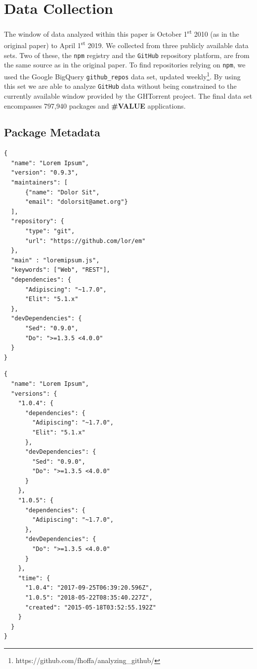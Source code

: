 \documentclass[10pt,conference]{IEEEtran}
\def\code#1{\texttt{#1}}
\begin{document}
\section{Data Collection}
The window of data analyzed within this paper is October 1\textsuperscript{st} 2010 (as in the original paper) to April 1\textsuperscript{st} 2019.
We collected from three publicly available data sets. Two of these, the \code{npm} registry and the \code{GitHub} repository platform, are from the same source as in the original paper.
To find repositories relying on \code{npm}, we used the Google BigQuery \code{github\_repos} data set, updated weekly\footnote{https://github.com/fhoffa/analyzing\_github/}.
By using this set we are able to analyze \code{GitHub} data without being constrained to the currently available window provided by the GHTorrent project\cite{Gousi13}.
The final data set encompasses 797,940 packages and \textbf{\#VALUE} applications.

\subsection{Package Metadata} \label{PackageMetadata}

\begin{lstlisting}[caption={A mock \code{npm} package.json. Some fields omitted for brevity.},captionpos=b,
  label=samplePkg, frame=single, firstline=1]
{
  "name": "Lorem Ipsum",
  "version": "0.9.3",
  "maintainers": [
      {"name": "Dolor Sit",
      "email": "dolorsit@amet.org"}
  ],
  "repository": {
      "type": "git",
      "url": "https://github.com/lor/em"
  },
  "main" : "loremipsum.js",
  "keywords": ["Web", "REST"],
  "dependencies": {
      "Adipiscing": "~1.7.0",
      "Elit": "5.1.x"
  },
  "devDependencies": {
      "Sed": "0.9.0",
      "Do": ">=1.3.5 <4.0.0" 
  }
}
\end{lstlisting}

\begin{lstlisting}[caption={A mock simplified \code{npm} metadata file.},captionpos=b,
  label=sampleSimpleMetadata, frame=single, firstline=1]
{
  "name": "Lorem Ipsum",
  "versions": {
    "1.0.4": {
      "dependencies": {
        "Adipiscing": "~1.7.0",
        "Elit": "5.1.x"
      },
      "devDependencies": {
        "Sed": "0.9.0",
        "Do": ">=1.3.5 <4.0.0"
      }
    },
    "1.0.5": {
      "dependencies": {
        "Adipiscing": "~1.7.0",
      },
      "devDependencies": {
        "Do": ">=1.3.5 <4.0.0"
      }
    },
    "time": {
      "1.0.4": "2017-09-25T06:39:20.596Z",
      "1.0.5": "2018-05-22T08:35:40.227Z",
      "created": "2015-05-18T03:52:55.192Z"
    }
  }
}
\end{lstlisting}
\end{document}
